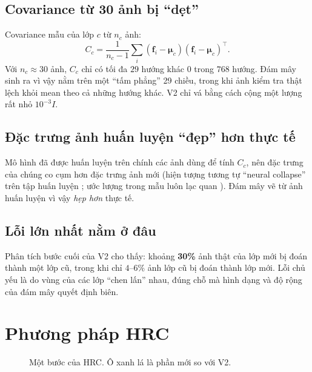 \documentclass[11pt]{article}
\newcommand{\bmu}{\boldsymbol{\mu}}
\newcommand{\vf}{\mathbf{f}}
\begin{document}
\subsection{Covariance từ 30 ảnh bị ``dẹt''}
Covariance mẫu của lớp $c$ từ $n_c$ ảnh:
\begin{equation}
C_c=\frac{1}{n_c-1}\sum_{i}(\vf_i-\bmu_c)(\vf_i-\bmu_c)^\top .
\end{equation}
Với $n_c\approx30$ ảnh, $C_c$ chỉ có tối đa $29$ hướng khác 0 trong $768$ hướng. Đám mây sinh ra vì vậy nằm trên một
``tấm phẳng'' 29 chiều, trong khi ảnh kiểm tra thật lệch khỏi mean theo cả những hướng khác. V2 chỉ vá bằng cách cộng
một lượng rất nhỏ $10^{-3}I$.

\subsection{Đặc trưng ảnh huấn luyện ``đẹp'' hơn thực tế}
Mô hình đã được huấn luyện trên chính các ảnh dùng để tính $C_c$, nên đặc trưng của chúng co cụm hơn đặc trưng ảnh
mới (hiện tượng tương tự ``neural collapse'' trên tập huấn luyện \cite{nc}; ước lượng trong mẫu luôn lạc quan
\cite{efron}). Đám mây vẽ từ ảnh huấn luyện vì vậy \emph{hẹp hơn} thực tế.

\subsection{Lỗi lớn nhất nằm ở đâu}
Phân tích bước cuối của V2 cho thấy: khoảng \textbf{30\%} ảnh thật của lớp mới bị đoán thành một lớp cũ, trong khi
chỉ $4$--$6\%$ ảnh lớp cũ bị đoán thành lớp mới. Lỗi chủ yếu là do vùng của các lớp ``chen lấn'' nhau, đúng chỗ mà
hình dạng và độ rộng của đám mây quyết định biên.

\section{Phương pháp HRC}

\begin{figure}[H]
\centering
{}
\caption{Một bước của HRC. Ô xanh lá là phần mới so với V2.}
\end{figure}
\end{document}
